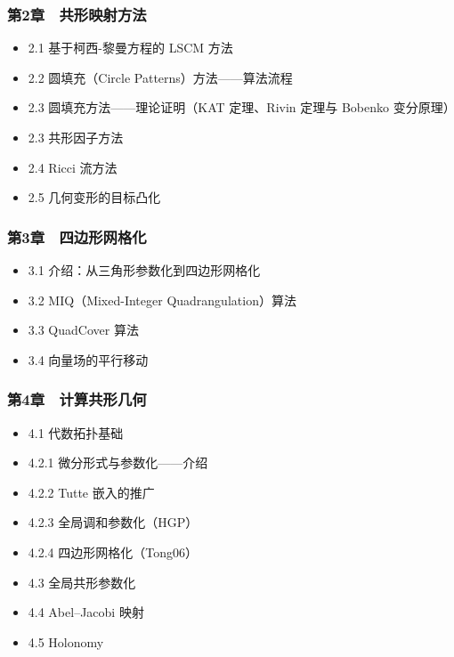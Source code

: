 \documentclass[
]{article}
\providecommand{\tightlist}{%
  \setlength{\itemsep}{0pt}\setlength{\parskip}{0pt}}
\begin{document}
\subsubsection{第2章　共形映射方法}\label{ux7b2c2ux7ae0-ux5171ux5f62ux6620ux5c04ux65b9ux6cd5}

\begin{itemize}
\tightlist
\item
  2.1 基于柯西-黎曼方程的 LSCM 方法
\item
  2.2 圆填充（Circle Patterns）方法------算法流程
\item
  2.3 圆填充方法------理论证明（KAT 定理、Rivin 定理与 Bobenko
  变分原理）
\item
  2.3 共形因子方法
\item
  2.4 Ricci 流方法
\item
  2.5 几何变形的目标凸化
\end{itemize}

\subsubsection{第3章　四边形网格化}\label{ux7b2c3ux7ae0-ux56dbux8fb9ux5f62ux7f51ux683cux5316}

\begin{itemize}
\tightlist
\item
  3.1 介绍：从三角形参数化到四边形网格化
\item
  3.2 MIQ（Mixed-Integer Quadrangulation）算法
\item
  3.3 QuadCover 算法
\item
  3.4 向量场的平行移动
\end{itemize}

\subsubsection{第4章　计算共形几何}\label{ux7b2c4ux7ae0-ux8ba1ux7b97ux5171ux5f62ux51e0ux4f55}

\begin{itemize}
\tightlist
\item
  4.1 代数拓扑基础
\item
  4.2.1 微分形式与参数化------介绍
\item
  4.2.2 Tutte 嵌入的推广
\item
  4.2.3 全局调和参数化（HGP）
\item
  4.2.4 四边形网格化（Tong06）
\item
  4.3 全局共形参数化
\item
  4.4 Abel--Jacobi 映射
\item
  4.5 Holonomy
\end{itemize}
\end{document}
